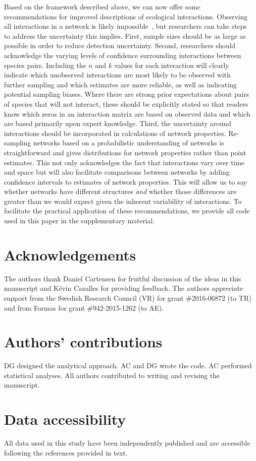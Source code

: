 \documentclass[12pt]{article}
\begin{document}
\begin{spacing}{2.0}
  Based on the framework described above, we can now offer some recommendations for improved descriptions of ecological interactions. Observing all interactions in a network is likely impossible~\citep{Jordano2016}, but researchers can take steps to address the uncertainty this implies. First, sample sizes should be as large as possible in order to reduce detection uncertainty. Second, researchers should acknowledge the varying levels of confidence surrounding interactions between species pairs. Including the $n$ and $k$ values for each interaction will clearly indicate which unobserved interactions are most likely to be observed with further sampling and which estimates are more reliable, as well as indicating potential sampling biases. Where there are strong prior expectations about pairs of species that will not interact, these should be explicitly stated so that readers know which zeros in an interaction matrix are based on observed data and which are based primarily upon expert knowledge. Third, the uncertainty around interactions should be incorporated in calculations of network properties. Re-sampling networks based on a probabilistic understanding of networks is straightforward and gives distributions for network properties rather than point estimates. This not only acknowledges the fact that interactions vary over time and space but will also facilitate comparisons between networks by adding confidence intervals to estimates of network properties. This will allow us to say whether networks have different structures \emph{and} whether those differences are greater than we would expect given the inherent variability of interactions. To facilitate the practical application of these recommendations, we provide all code used in this paper in the supplementary material. 


\section*{Acknowledgements}

  The authors thank Daniel Cartensen for fruitful discussion of the ideas in this manuscript and K\'{e}vin Cazalles for providing feedback. The authors appreciate support from the Swedish Research Council (VR) for grant \#2016-06872 (to TR) and from Formas for grant \#942-2015-1262 (to AE).


\section*{Authors' contributions}

DG designed the analytical approach. AC and DG wrote the code. AC performed statistical analyses. All authors contributed to writing and revising the manuscript.


\section*{Data accessibility}

All data used in this study have been independently published and are accessible following the references provided in text.



\end{spacing}
\end{document}
